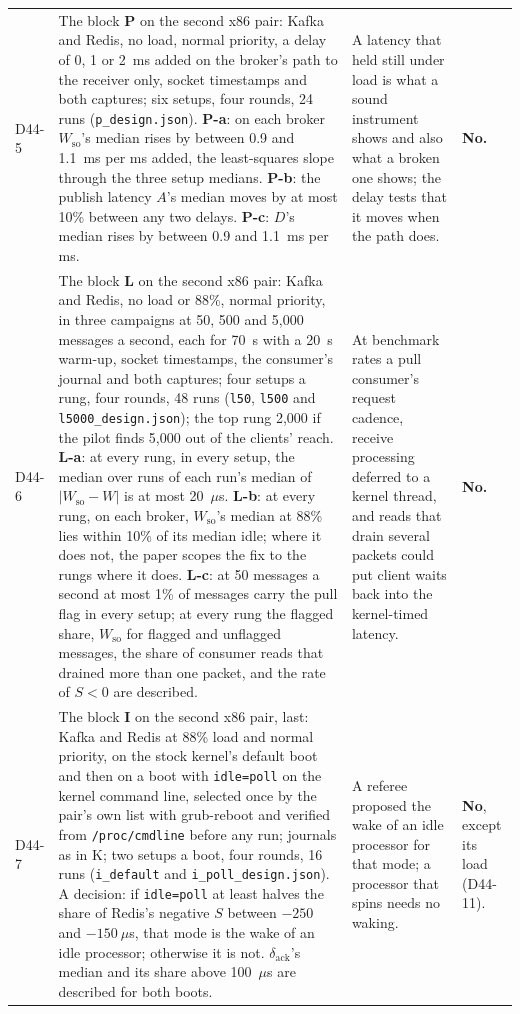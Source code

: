 \documentclass[11pt]{article}
\begin{document}
{\begin{longtable}{@{}p{1.1cm} >{\raggedright\arraybackslash}p{6.1cm} >{\raggedright\arraybackslash}p{6.0cm} >{\raggedright\arraybackslash}p{2.2cm}@{}}
D44-5 & The block \textbf{P} on the second x86 pair: Kafka and Redis, no load, normal priority, a delay of 0, 1 or 2~ms added on the broker's path to the receiver only, socket timestamps and both captures; six setups, four rounds, 24 runs (\texttt{p\_design.json}). \textbf{P-a}: on each broker $W_{\mathrm{so}}$'s median rises by between 0.9 and 1.1~ms per ms added, the least-squares slope through the three setup medians. \textbf{P-b}: the publish latency $A$'s median moves by at most 10\% between any two delays. \textbf{P-c}: $D$'s median rises by between 0.9 and 1.1~ms per ms. & A latency that held still under load is what a sound instrument shows and also what a broken one shows; the delay tests that it moves when the path does. & \textbf{No.} \\
D44-6 & The block \textbf{L} on the second x86 pair: Kafka and Redis, no load or 88\%, normal priority, in three campaigns at 50, 500 and 5,000 messages a second, each for 70~s with a 20~s warm-up, socket timestamps, the consumer's journal and both captures; four setups a rung, four rounds, 48 runs (\texttt{l50}, \texttt{l500} and \texttt{l5000\_design.json}); the top rung 2,000 if the pilot finds 5,000 out of the clients' reach. \textbf{L-a}: at every rung, in every setup, the median over runs of each run's median of $|W_{\mathrm{so}} - W|$ is at most 20~$\mu$s. \textbf{L-b}: at every rung, on each broker, $W_{\mathrm{so}}$'s median at 88\% lies within 10\% of its median idle; where it does not, the paper scopes the fix to the rungs where it does. \textbf{L-c}: at 50 messages a second at most 1\% of messages carry the pull flag in every setup; at every rung the flagged share, $W_{\mathrm{so}}$ for flagged and unflagged messages, the share of consumer reads that drained more than one packet, and the rate of $S < 0$ are described. & At benchmark rates a pull consumer's request cadence, receive processing deferred to a kernel thread, and reads that drain several packets could put client waits back into the kernel-timed latency. & \textbf{No.} \\
D44-7 & The block \textbf{I} on the second x86 pair, last: Kafka and Redis at 88\% load and normal priority, on the stock kernel's default boot and then on a boot with \texttt{idle=poll} on the kernel command line, selected once by the pair's own list with grub-reboot and verified from \texttt{/proc/cmdline} before any run; journals as in K; two setups a boot, four rounds, 16 runs (\texttt{i\_default} and \texttt{i\_poll\_design.json}). A decision: if \texttt{idle=poll} at least halves the share of Redis's negative $S$ between $-250$ and $-150~\mu$s, that mode is the wake of an idle processor; otherwise it is not. $\delta_{\mathrm{ack}}$'s median and its share above 100~$\mu$s are described for both boots. & A referee proposed the wake of an idle processor for that mode; a processor that spins needs no waking. & \textbf{No}, except its load (D44-11). \\

\end{longtable}}
\end{document}
